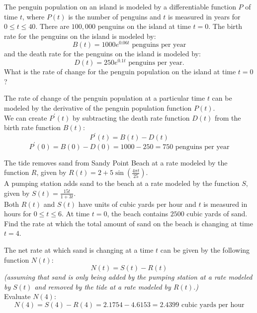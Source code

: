 \documentclass[12pt,letterpaper, onecolumn]{exam}
\begin{document}
\begin{questions}
\pagebreak

\question
The penguin population on an island is modeled by a differentiable function $P$ of time $t$, where $P(t)$ is the number of penguins and $t$ is measured in years for $0 \leq t \leq 40$. There are $100,000$ penguins on the island at time $t = 0$. The birth rate for the penguins on the island is modeled by:
$$B(t) = 1000e^{0.06t} \text{ penguins per year}$$ 
and the death rate for the penguins on the island is modeled by:
$$D(t)=250e^{0.1t} \text{ penguins per year.}$$
What is the rate of change for the penguin population on the island at time $t = 0$?
\begin{solution}
	The rate of change of the penguin population at a particular time $t$ can be modeled by the derivative of the penguin population function $P(t)$. \\
	We can create $P^\prime(t)$ by subtracting the death rate function $D(t)$ from the birth rate function $B(t)$:
	$$P^\prime(t)=B(t)-D(t)$$
	$$P^\prime(0)=B(0)-D(0) = 1000-250 = \boxed{750 \text{ penguins per year}}$$
\end{solution}


\pagebreak

\question
The tide removes sand from Sandy Point Beach at a rate modeled by the function $R$, given by $R(t)=2+5\sin(\frac{4\pi t}{25})$. \\
A pumping station adds sand to the beach at a rate modeled by the function $S$, given by $S(t)=\frac{15t}{1+3t}$. \\
Both $R(t)$ and $S(t)$ have units of cubic yards per hour and $t$ is measured in hours for $0 \leq t \leq 6$. At time $t = 0$, the beach contains $2500$ cubic yards of sand. \\
Find the rate at which the total amount of sand on the beach is changing at time $t = 4$.

\begin{solution}
	The net rate at which sand is changing at a time $t$ can be given by the following function $N(t)$:
	$$N(t)=S(t)-R(t)$$
	\emph{(assuming that sand is only being added by the pumping station at a rate modeled by $S(t)$ and removed by the tide at a rate modeled by $R(t)$.)} \\
	Evaluate $N(4)$:
	$$N(4)=S(4)-R(4)=2.1754-4.6153=\boxed{2.4399 \text{ cubic yards per hour}}$$
\end{solution}

\pagebreak


\end{questions}
\end{document}
